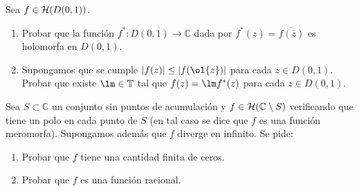 \documentclass[12pt]{article}
\begin{document}
    \begin{ejercicio}[2.5 puntos]
        Sea $f\in \mathcal{H}(D(0,1))$.
        \begin{enumerate}[label=\alph*)]
            \item Probar que la función $f^\ast:D(0,1)\to \mathbb{C}$ dada por $f^\ast(z) = \overline{f(\overline{z})}$ es holomorfa en $D(0,1)$.
            \item Supongamos que se cumple $|f(z)| \leq |f(\ol{z})|$ para cada $z\in D(0,1)$. Probar que existe $\lm\in \bb{T}$ tal que $f(z)=\lm f^\ast(z)$ para cada $z\in D(0,1)$.
        \end{enumerate}
    \end{ejercicio}

    \begin{ejercicio}[2.5 puntos]
        Sea $S\subset \mathbb{C}$ un conjunto sin puntos de acumulación y $f\in \mathcal{H}(\mathbb{C}\setminus S)$ verificando que tiene un polo en cada punto de $S$ (en tal caso se dice que $f$ es una función meromorfa). Supongamos además que $f$ diverge en infinito. Se pide:
        \begin{enumerate}[label=\alph*)]
            \item Probar que $f$ tiene una cantidad finita de ceros.
            \item Probar que $f$ es una función racional.
        \end{enumerate}
    \end{ejercicio}
\end{document}
